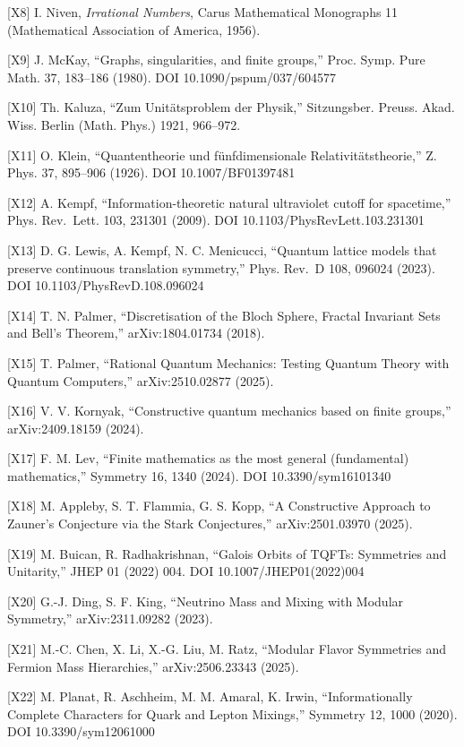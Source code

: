 \documentclass[
  a4paper,
]{ltjsarticle}
\begin{document}
{[}X8{]} I. Niven, \emph{Irrational Numbers}, Carus Mathematical
Monographs 11 (Mathematical Association of America, 1956).

{[}X9{]} J. McKay, ``Graphs, singularities, and finite groups,'' Proc.
Symp. Pure Math. 37, 183--186 (1980). DOI 10.1090/pspum/037/604577

{[}X10{]} Th. Kaluza, ``Zum Unitätsproblem der Physik,'' Sitzungsber.
Preuss. Akad. Wiss. Berlin (Math. Phys.) 1921, 966--972.

{[}X11{]} O. Klein, ``Quantentheorie und fünfdimensionale
Relativitätstheorie,'' Z. Phys. 37, 895--906 (1926). DOI
10.1007/BF01397481

{[}X12{]} A. Kempf, ``Information-theoretic natural ultraviolet cutoff
for spacetime,'' Phys. Rev.~Lett. 103, 231301 (2009). DOI
10.1103/PhysRevLett.103.231301

{[}X13{]} D. G. Lewis, A. Kempf, N. C. Menicucci, ``Quantum lattice
models that preserve continuous translation symmetry,'' Phys. Rev.~D
108, 096024 (2023). DOI 10.1103/PhysRevD.108.096024

{[}X14{]} T. N. Palmer, ``Discretisation of the Bloch Sphere, Fractal
Invariant Sets and Bell's Theorem,'' arXiv:1804.01734 (2018).

{[}X15{]} T. Palmer, ``Rational Quantum Mechanics: Testing Quantum
Theory with Quantum Computers,'' arXiv:2510.02877 (2025).

{[}X16{]} V. V. Kornyak, ``Constructive quantum mechanics based on
finite groups,'' arXiv:2409.18159 (2024).

{[}X17{]} F. M. Lev, ``Finite mathematics as the most general
(fundamental) mathematics,'' Symmetry 16, 1340 (2024). DOI
10.3390/sym16101340

{[}X18{]} M. Appleby, S. T. Flammia, G. S. Kopp, ``A Constructive
Approach to Zauner's Conjecture via the Stark Conjectures,''
arXiv:2501.03970 (2025).

{[}X19{]} M. Buican, R. Radhakrishnan, ``Galois Orbits of TQFTs:
Symmetries and Unitarity,'' JHEP 01 (2022) 004. DOI
10.1007/JHEP01(2022)004

{[}X20{]} G.-J. Ding, S. F. King, ``Neutrino Mass and Mixing with
Modular Symmetry,'' arXiv:2311.09282 (2023).

{[}X21{]} M.-C. Chen, X. Li, X.-G. Liu, M. Ratz, ``Modular Flavor
Symmetries and Fermion Mass Hierarchies,'' arXiv:2506.23343 (2025).

{[}X22{]} M. Planat, R. Aschheim, M. M. Amaral, K. Irwin,
``Informationally Complete Characters for Quark and Lepton Mixings,''
Symmetry 12, 1000 (2020). DOI 10.3390/sym12061000
\end{document}
